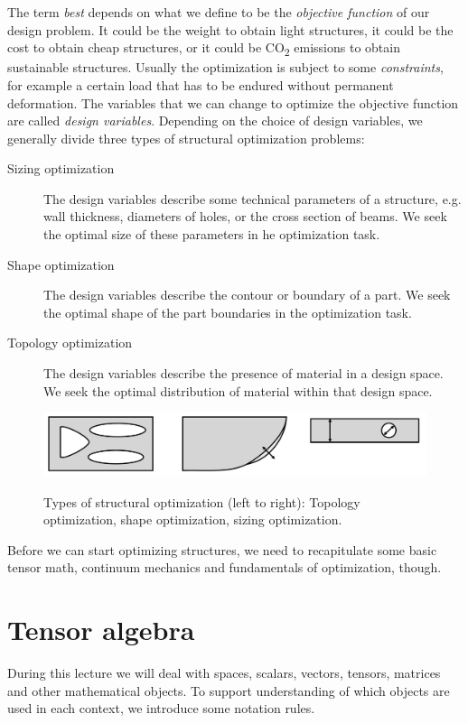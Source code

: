 The term \emph{best} depends on what we define to be the \emph{objective function} of our design problem. It could be the weight to obtain light structures, it could be the cost to obtain cheap structures, or it could be CO\textsubscript{2} emissions to obtain sustainable structures. Usually the optimization is subject to some \emph{constraints}, for example a certain load that has to be endured without permanent deformation. The variables that we can change to optimize the objective function are called \emph{design variables}. Depending on the choice of design variables, we generally divide three types of structural optimization problems: 
\begin{description}
    \item[Sizing optimization]{The design variables describe some technical parameters of a structure, e.g. wall thickness, diameters of holes, or the cross section of beams. We seek the optimal size of these parameters in he optimization task.}
    \item[Shape optimization]{The design variables describe the contour or boundary of a part. We seek the optimal shape of the part boundaries in the optimization task.}
    \item[Topology optimization]{The design variables describe the presence of material in a design space. We seek the optimal distribution of material within that design space.}
\end{description}

\begin{figure}[!htpb]
    \centering
    \includegraphics[width=\textwidth, alt={Sketch topology optimization, shape optimization, sizing optimization}]{figures/structural_optimization_types.png}
    \caption{Types of structural optimization (left to right): Topology optimization, shape optimization, sizing optimization.}
    \label{fig:structural_optimization_types.}
\end{figure}

Before we can start optimizing structures, we need to recapitulate some basic tensor math, continuum mechanics and fundamentals of optimization, though. 

\section{Tensor algebra}
During this lecture we will deal with spaces, scalars, vectors, tensors, matrices and other mathematical objects. To support understanding of which objects are used in each context, we introduce some notation rules. 

